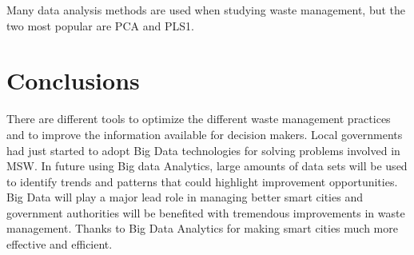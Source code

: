 \documentclass[sigconf]{acmart}
\begin{document}
Many data analysis methods are used when studying waste management, but the two most popular are PCA and PLS1. 
~\cite{bohm2013}




\section{Conclusions}

There are different tools to optimize the different waste management practices  and to improve the information available for decision makers.
Local governments had just started to adopt Big Data technologies for solving problems involved in MSW. In future using Big data Analytics, large amounts of data sets will be used to identify trends and patterns that could highlight improvement opportunities. Big Data will play a major lead role in managing better smart cities and government authorities will be benefited with tremendous improvements in waste management. Thanks to Big Data Analytics for making smart cities much more effective and efficient.


\appendix



\appendix









 
\end{document}
